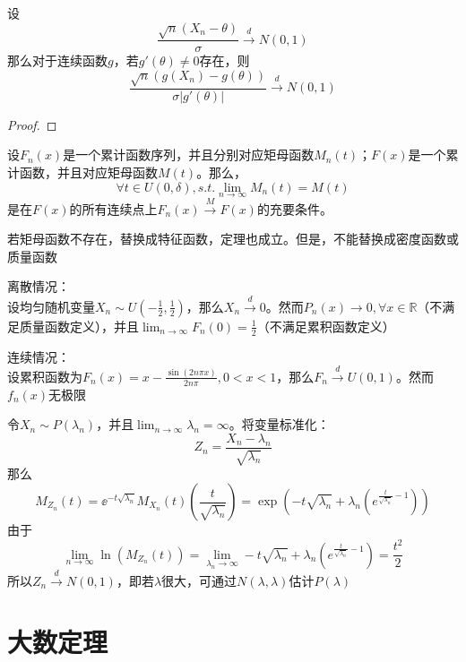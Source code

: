 \begin{theorem}[theta方法的极限定理]
    设
    \[ \frac{\sqrt{n}(X_n-\theta)}{\sigma} \xrightarrow{d} N(0,1) \]
    那么对于连续函数$g$，若$g'(\theta)\neq 0$存在，则
    \[ \frac{\sqrt{n}(g(X_n)-g(\theta))}{\sigma|g'(\theta)|} \xrightarrow{d} N(0,1) \]
\end{theorem}

\begin{proof}
\end{proof}

\begin{theorem}[连续性定理]
    设$F_n(x)$是一个累计函数序列，并且分别对应矩母函数$M_n(t)$；$F(x)$是一个累计函数，并且对应矩母函数$M(t)$。那么，
    \[ \forall t \in U(0,\delta) ,s.t. \lim_{n \to \infty}M_n(t) = M(t)\]
    是在$F(x)$的所有连续点上$F_n(x) \xrightarrow{M} F(x)$的充要条件。
\end{theorem}
\begin{remark}
    若矩母函数不存在，替换成特征函数，定理也成立。但是，不能替换成密度函数或质量函数
\end{remark}

\begin{example}
    离散情况：\\
    设均匀随机变量$X_n \sim U(-\frac{1}{2},\frac{1}{2})$，那么$X_n \xrightarrow{d} 0$。然而$P_n(x) \to 0, \forall x \in \mathbb{R}$（不满足质量函数定义），并且$\lim_{n \to \infty}F_n(0)=\frac{1}{2}$（不满足累积函数定义）

    连续情况：\\
    设累积函数为$F_n(x)=x-\frac{\sin (2n\pi x)}{2n\pi}, 0<x<1$，那么$F_n \xrightarrow{d} U(0,1)$。然而$f_n(x)$无极限
\end{example}

\begin{example}[泊松分布收敛于正态分布]
    令$X_n \sim P(\lambda_n)$，并且$\lim_{n \to \infty}\lambda_n =\infty$。将变量标准化：
    \[ Z_n=\frac{X_n-\lambda_n}{\sqrt{\lambda_n}} \]
    那么
    \[M_{Z_n}(t)=\ee^{-t\sqrt{\lambda_n}}M_{X_n}(t)(\frac{t}{\sqrt{\lambda_n}})=\exp (-t\sqrt{\lambda_n}+\lambda_n(e^{\frac{t}{\sqrt{\lambda_n}}-1}))\]
    由于
    \[ \lim_{n \to \infty}\ln (M_{Z_n}(t))=\lim_{\lambda_n \to \infty}-t\sqrt{\lambda_n}+\lambda_n(e^{\frac{t}{\sqrt{\lambda_n}}-1})=\frac{t^2}{2} \]
    所以$Z_n \xrightarrow{d} N(0,1)$，即若$\lambda$很大，可通过$N(\lambda,\lambda)$估计$P(\lambda)$
\end{example}

\section{大数定理}


